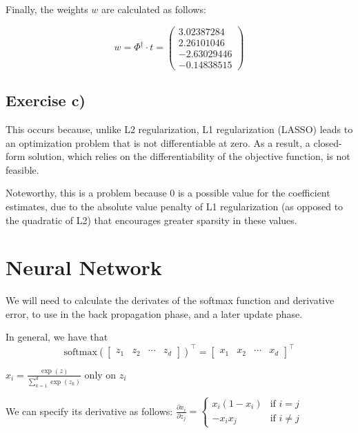 \documentclass{article}
\begin{document}
Finally, the weights \( w \) are calculated as follows:

\[
w = \Phi^\dagger \cdot t = 
\begin{pmatrix} 
3.02387284 \\ 
2.26101046 \\ 
-2.63029446 \\ 
-0.14838515 
\end{pmatrix}
\]

\subsection{Exercise c)}
This occurs because, unlike L2 regularization, L1 regularization (LASSO) leads to an optimization problem that is not differentiable at zero. As a result, a closed-form solution, which relies on the differentiability of the objective function, is not feasible.

Noteworthy, this is a problem because 0 is a possible value for the coefficient estimates, due to the absolute value penalty of L1 regularization (as opposed to the quadratic of L2) that encourages greater sparsity in these values.

\section{Neural Network}
We will need to calculate the derivates of the softmax function and derivative error, 
to use in the back propagation phase, and a later update phase.


In general, we have that
\[
\text{softmax} \left( \begin{bmatrix} z_1 & z_2 & \cdots & z_d \end{bmatrix} \right)^\top = \begin{bmatrix} x_1 & x_2 & \cdots & x_d \end{bmatrix}^\top
\]


\( x_i = \frac{\exp(z)}{\sum_{k=1}^d \exp(z_k)} \) only on \( z_i \) 

We can specify its derivative as follows:
$
\frac{\partial x_i}{\partial z_j} = 
\begin{cases} 
x_i (1 - x_i) & \text{if } i = j \\ 
-x_i x_j & \text{if } i \neq j 
\end{cases}
$
\end{document}
